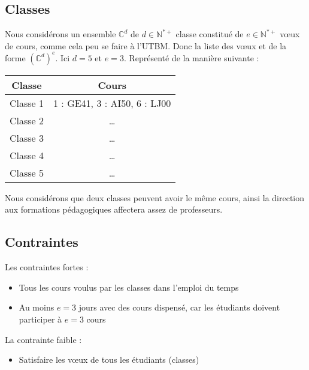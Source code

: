 \subsection{Classes}

Nous considérons un ensemble $\mathbb{C}^d$ de $d \in \mathbb{N}^{*+}$ classe constitué de $e \in \mathbb{N}^{*+}$ v\oe ux de cours, comme cela peu se faire à l'\gls{UTBM}.
Donc la liste des v\oe ux et de la forme $(\mathbb{C}^d)^e$.
Ici $d = 5$ et $e = 3$.
Représenté de la manière suivante :

\begin{center}
    \begin{tabular}{|c|c|}
        \hline
        Classe   & Cours                        \\
        \hline
        Classe 1 & 1 : GE41, 3 : AI50, 6 : LJ00 \\
        \hline
        Classe 2 & \ldots                       \\
        \hline
        Classe 3 & \ldots                       \\
        \hline
        Classe 4 & \ldots                       \\
        \hline
        Classe 5 & \ldots                       \\
        \hline
    \end{tabular}
\end{center}

Nous considérons que deux classes peuvent avoir le même cours, ainsi la direction aux formations pédagogiques affectera assez de professeurs.

\subsection{Contraintes}

Les contraintes fortes :
\begin{itemize}
    \item Tous les cours voulus par les classes dans l'emploi du temps
    \item Au moins $e = 3$ jours avec des cours dispensé, car les étudiants doivent participer à $e = 3$ cours
\end{itemize}

La contrainte faible :
\begin{itemize}
    \item Satisfaire les v\oe ux de tous les étudiants (classes)
\end{itemize}

